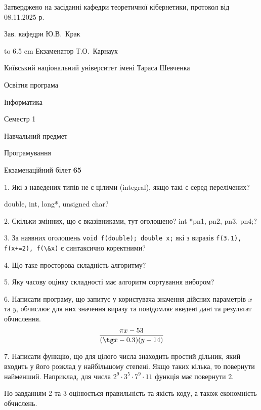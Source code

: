 \documentclass[12pt, ukrainian]{article}
\def\code#1{\Verb!#1!}
\begin{document}
{\smallskip\smallskip \begin {scriptsize} Затверджено на засіданні кафедри теоретичної кібернетики, протокол   від   08.11.2025 р.\par\smallskip\smallskip\smallskip\smallskip
{\parbox {6.5 cm} {Зав. кафедри \dotfill Ю.В.~Крак}}\hspace {0.7cm} {\hbox to 6.5 cm { Екзаменатор \dotfill Т.О.~Карнаух}} \end{scriptsize}}
\newpage
{{\begin {scriptsize}\par
{ \center  Київський національний університет імені Тараса Шевченка \par}
{\parbox {5 cm}{Освітня програма \hfill}{\parbox {7 cm}{Інформатика\hfill}}\parbox {6 cm}{\hfill Семестр 1}}\par
{\parbox {5 cm} {Навчальний предмет \hfill}\parbox {7 cm}{Програмування \hfill}\parbox {6cm}{\hfill}\par}\vspace{-15pt} \end{scriptsize}}{\center Екзаменаційний білет \No \textbf { 65 }\par}}
{%
1. Які з наведених типів не є цілими (integral), якщо такі є серед перелічених?

double, int, long*, unsigned char?
\par
\vspace{2mm}
2. Скільки змінних, що є вказівниками, тут оголошено?
int *pn1, pn2, pn3, pn4;?
\par
\vspace{2mm}
3. За наявних оголошень \code{void f(double); double x;} які з виразів \code{f(3.1), f(x+=2), f(\&x)} є синтаксично коректними?
\par
\vspace{2mm}
4. Що таке просторова складність алгоритму?
\par
\vspace{2mm}
5. Яку часову оцінку складності має алгоритм сортування вибором?
\par
\vspace{2mm}
6. Написати програму, що запитує у користувача значення дійсних параметрів $x$ та $y$, обчислює для них значення виразу та повiдомляє введенi данi та результат обчислення.
$$\frac{\pi x - 53}{(\tg x - 0.3) (y - 14)}$$ 

\par
7. Написати функцію, що для цілого числа знаходить простий дільник, який входить у його розклад у найбільшому степені. Якщо таких кілька, то повернути найменший. Наприклад, для числа $2^{9}{\cdot}3^5{\cdot}7^9{\cdot}11$ функція має повернути $2$.

По завданням 2 та 3 оцінюється правильність та якість коду, а також економність обчислень.

}
\end{document}
